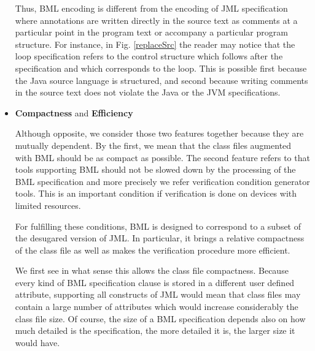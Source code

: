 \begin{itemize}

	    Thus, BML encoding is different from the encoding of JML
	    specification where annotations are written directly in
	    the source text as comments at a particular point in the
	    program text or accompany a particular program
	    structure. For instance, in Fig. \ref{replaceSrc} the
	    reader may notice that the loop specification refers to
	    the control structure which follows after the
	    specification and which corresponds to the loop.  This is
	    possible first because the Java source language is
	    structured, and second because writing comments in the
	    source text does not violate the Java or the JVM
	    specifications.
	  


\item \textbf{Compactness} and \textbf{Efficiency}

      Although opposite, we consider those two features together
      because they are mutually dependent. By the first, we mean that
      the class files augmented with BML should be as compact as
      possible.  The second feature refers to that tools supporting
      BML should not be slowed down by the processing of the BML
      specification and more precisely we refer verification condition
      generator tools.  This is an important condition if verification
      is done on devices with limited resources.

      For fulfilling these conditions, BML is designed to correspond
      to a subset of the desugared version of JML.  In particular, it
      brings a relative compactness of the class file as well as makes
      the verification procedure more efficient.


      We first see in what sense this allows the class file
      compactness. Because every kind of BML specification clause is
      stored in a different user defined attribute, supporting all
      constructs of JML would mean that class files may contain a
      large number of attributes which would increase considerably the
      class file size. Of course, the size of a BML specification
      depends also on how much detailed is the specification, the more
      detailed it is, the larger size it would have.
      

\end{itemize}
